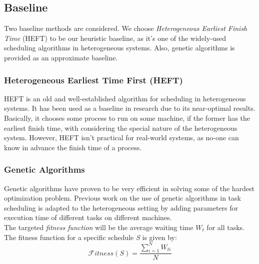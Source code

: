\documentclass[twocolumn,11pt]{IEEEtran}
\begin{document}
\subsection{Baseline}
Two baseline methods are considered. We choose \emph{Heterogeneous Earliest Finish Time} (HEFT)\cite{993206} to be our heuristic baseline, as it's one of the widely-used scheduling algorithms in heterogeneous systems. Also, genetic algorithms\cite{article2} is provided as an approximate baseline.

\subsubsection{Heterogeneous Earliest Time First (HEFT)}
HEFT\cite{993206} is an old and well-established algorithm for scheduling in heterogeneous systems. It has been used as a baseline in research due to its near-optimal results. Basically, it chooses some process to run on some machine, if the former has the earliest finish time, with considering the special nature of the heterogeneous system. However, HEFT isn't practical for real-world systems, as no-one can know in advance the finish time of a process.

\subsubsection{Genetic Algorithms}
Genetic algorithms\cite{article2} have proven to be very efficient in solving some of the hardest optimization problem. Previous work on the use of genetic algorithms in task scheduling \cite{article2} is adapted to the heterogeneous setting by adding parameters for execution time of different tasks on different machines. \\
The targeted \emph{fitness function} will be the average waiting time $W_t$ for all tasks. The fitness function for a specific schedule \emph{S} is given by:
\begin{equation}
\mathcal Fitness(S) = \frac{\sum_{i=1}^{N} W_{ti}}{N}
\end{equation}
\end{document}
